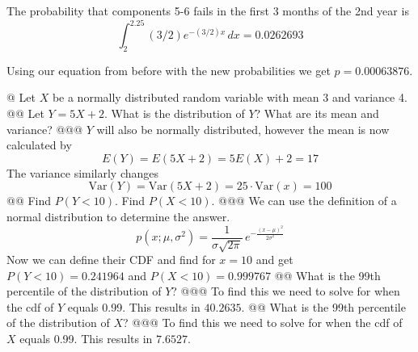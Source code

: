 \documentclass[10pt]{article}
\begin{document}
\begin{easylist}[enumerate]
    The probability that components 5-6 fails in the first 3 months of the 2nd year is
    \[
        \int^{2.25}_2 (3/2)e^{-(3/2)x} \, dx = 0.0262693
    \]

    Using our equation from before with the new probabilities we get $p=\boxed{0.00063876}$.

    @ Let $X$ be a normally distributed random variable with mean 3 and variance 4.
    @@ Let $Y = 5X + 2$. What is the distribution of $Y$? What are its mean and variance?
    @@@ $Y$ will also be normally distributed, however the mean is now calculated by
    \[ E(Y) = E(5X+2) = 5 E(X) + 2 = 17 \]
    The variance similarly changes
    \[ \text{Var}(Y) = \text{Var}(5X+2) = 25 \cdot \text{Var}(x) = 100 \]
    @@ Find $P(Y < 10)$. Find $P(X < 10)$.
    @@@ We can use the definition of a normal distribution to determine the answer.
    \[ p(x;\mu, \sigma^2) = \frac{1}{\sigma\sqrt{2\pi}}\, e^{-\frac{(x - \mu)^2}{2 \sigma^2}} \]
    Now we can define their CDF and find for $x=10$ and get $P(Y < 10) = 0.241964$ and $P(X < 10)=0.999767$
    @@ What is the 99th percentile of the distribution of $Y$?
    @@@ To find this we need to solve for when the cdf of $Y$ equals 0.99. This results in $40.2635$.
    @@ What is the 99th percentile of the distribution of $X$?
    @@@ To find this we need to solve for when the cdf of $X$ equals 0.99. This results in $7.6527$.


\end{easylist}
\end{document}

